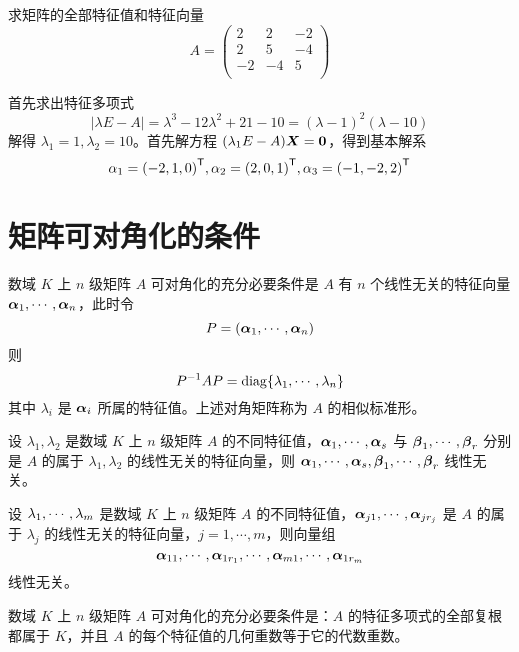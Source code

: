 \begin{example}
	求矩阵的全部特征值和特征向量 \[ A=\left(
		\begin{matrix}
				2  & 2  & -2 \\
				2  & 5  & -4 \\
				-2 & -4 & 5  \\
			\end{matrix}
		\right) \]
\end{example}

\begin{solution}
	首先求出特征多项式
	\[ |\lambda E - A| = \lambda^3 - 12 \lambda^2 + 21 - 10 = (\lambda - 1)^2(\lambda - 10) \]
	解得 $\lambda_1 = 1, \lambda_2 = 10$。首先解方程 $(\lambda_1 E - A) \boldsymbol{X} = \boldsymbol{0}$，得到基本解系
	\[ \alpha_1 = {(-2, 1, 0)}^\mathsf{T}, \alpha_2 = {(2, 0, 1)}^\mathsf{T}, \alpha_3 = {(-1, -2, 2)}^\mathsf{T} \]
\end{solution}

\section{矩阵可对角化的条件}

\begin{theorem}
	数域 $K$ 上 $n$ 级矩阵 $A$ 可对角化的充分必要条件是 $A$ 有 $n$ 个线性无关的特征向量 $\boldsymbol{\alpha}_1,\cdots,\boldsymbol{\alpha}_n$，此时令
	\[ P=(\boldsymbol{\alpha}_1,\cdots,\boldsymbol{\alpha}_n) \]
	则
	\[ P^{-1}AP = \operatorname{diag}\{\lambda_1,\cdots,\lambda_n\} \]
	其中 $\lambda_i$ 是 $\boldsymbol{\alpha}_i$ 所属的特征值。上述对角矩阵称为 $A$ 的相似标准形。
\end{theorem}

\begin{theorem}
	设 $\lambda_1,\lambda_2$ 是数域 $K$ 上 $n$ 级矩阵 $A$ 的不同特征值，$\boldsymbol{\alpha}_1,\cdots,\boldsymbol{\alpha}_s$ 与 $\boldsymbol{\beta}_1,\cdots,\boldsymbol{\beta}_r$ 分别是 $A$ 的属于 $\lambda_1,\lambda_2$ 的线性无关的特征向量，则 $\boldsymbol{\alpha}_1,\cdots,\boldsymbol{\alpha}_s,\boldsymbol{\beta}_1,\cdots,\boldsymbol{\beta}_r$ 线性无关。
\end{theorem}

\begin{theorem}
	设 $\lambda_1,\cdots,\lambda_m$ 是数域 $K$ 上 $n$ 级矩阵 $A$ 的不同特征值，$\boldsymbol{\alpha}_{j1},\cdots,\boldsymbol{\alpha}_{jr_j}$ 是 $A$ 的属于 $\lambda_j$ 的线性无关的特征向量，$j=1,\cdots,m$，则向量组
	\[ \boldsymbol{\alpha}_{11},\cdots,\boldsymbol{\alpha}_{1r_1},\cdots,\boldsymbol{\alpha}_{m1},\cdots,\boldsymbol{\alpha}_{1r_m} \]
	线性无关。
\end{theorem}

\begin{theorem}
	数域 $K$ 上 $n$ 级矩阵 $A$ 可对角化的充分必要条件是：$A$ 的特征多项式的全部复根都属于 $K$，并且 $A$ 的每个特征值的几何重数等于它的代数重数。
\end{theorem}

